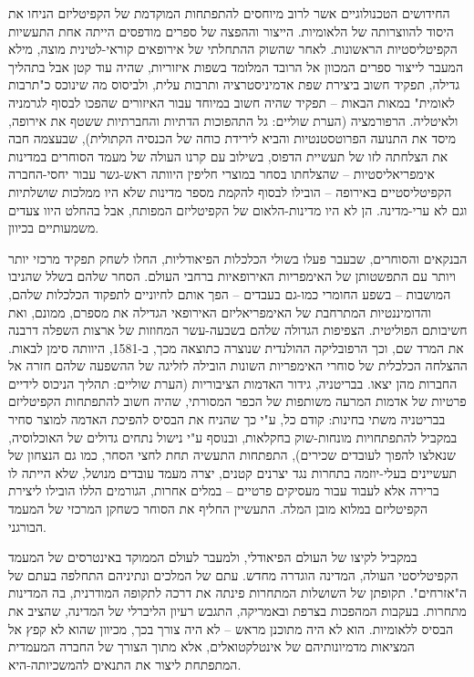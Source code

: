 החידושים הטכנולוגיים אשר לרוב מיוחסים להתפתחות המוקדמת של הקפיטליזם הניחו את היסוד להווצרותה של הלאומיות. הייצור וההפצה של ספרים מודפסים הייתה אחת התעשיות הקפיטליסטיות הראשונות. לאחר שהשוק ההתחלתי של אירופאים קוראי-לטינית מוצה, מילא המעבר לייצור ספרים המכוון אל הרובד המלומד בשפות איזוריות, שהיה עוד קטן אבל בתהליך גדילה, תפקיד חשוב ביצירת שפת אדמיניסטרציה ותרבות עלית, ולביסוס מה שינוכס כ"תרבות לאומית" במאות הבאות – תפקיד שהיה חשוב במיוחד עבור האיזורים שהפכו לבסוף לגרמניה ולאיטליה. הרפורמציה (הערת שוליים: גל התהפוכות הדתיות והחברתיות ששטף את אירופה, מיסד את התנועה הפרוטסטנטיות והביא לירידת כוחה של הכנסיה הקתולית), שבעצמה חבה את הצלחתה לזו של תעשיית הדפוס, בשילוב עם קרנו העולה של מעמד הסוחרים במדינות אימפריאליסטיות – שהצלחתו בסחר במוצרי חליפין היוותה ראש-גשר עבור יחסי-החברה הקפיטליסטיים באירופה – הובילו לבסוף להקמת מספר מדינות שלא היו ממלכות שושלתיות וגם לא ערי-מדינה. הן לא היו מדינות-הלאום של הקפיטליזם המפותח, אבל בהחלט היוו צעדים משמעותיים בכיוון.

הבנקאים והסוחרים, שבעבר פעלו בשולי הכלכלות הפיאודליות, החלו לשחק תפקיד מרכזי יותר ויותר עם התפשטותן של האימפריות האירופאיות ברחבי העולם. הסחר שלהם בשלל שהניבו המושבות – בשפע החומרי כמו-גם בעבדים – הפך אותם לחיוניים לתפקוד הכלכלות שלהם, והדומיננטיות המתרחבת של האימפריאליזם האירופאי הגדילה את מספרם, ממונם, ואת חשיבותם הפוליטית. הצפיפות הגדולה שלהם בשבעה-עשר המחוזות של ארצות השפלה דרבנה את המרד שם, וכך הרפובליקה ההולנדית שנוצרה כתוצאה מכך, ב-1581, היוותה סימן לבאות. ההצלחה הכלכלית של סוחרי האימפריות השונות הובילה לזליגה של ההשפעה שלהם חזרה אל החברות מהן יצאו. בבריטניה, גידור האדמות הציבוריות (הערת שוליים: תהליך הניכוס לידיים פרטיות של אדמות המרעה משותפות של הכפר המסורתי, שהיה חשוב להתפתחות הקפיטליזם בבריטניה משתי בחינות: קודם כל, ע"י כך שהניח את הבסיס להפיכת האדמה למוצר סחיר במקביל להתפתחויות מונחות-שוק בחקלאות, ובנוסף ע"י נישול נתחים גדולים של האוכלוסיה, שנאלצו להפוך לעובדים שכירים), התפתחות התעשיה תחת לחצי הסחר, כמו גם הנצחון של תעשיינים בעלי-יוזמה בתחרות נגד יצרנים קטנים, יצרה מעמד עובדים מנושל, שלא הייתה לו ברירה אלא לעבוד עבור מעסיקים פרטיים – במלים אחרות, הגורמים הללו הובילו ליצירת הקפיטליזם במלוא מובן המלה. התעשיין החליף את הסוחר כשחקן המרכזי של המעמד הבורגני.

במקביל לקיצו של העולם הפיאודלי, ולמעבר לעולם הממוקד באינטרסים של המעמד הקפיטליסטי העולה, המדינה הוגדרה מחדש. עתם של המלכים ונתיניהם התחלפה בעתם של ה"אזרחים". תקופתן של השושלות המתחרות פינתה את דרכה לתקופה המודרנית, בה המדינות מתחרות. בעקבות המהפכות בצרפת ובאמריקה, התגבש רעיון הליברלי של המדינה, שהציב את הבסיס ללאומיות. הוא לא היה מתוכנן מראש – לא היה צורך בכך, מכיוון שהוא לא קפץ אל המציאות מדמיונותיהם של אינטלקטואלים, אלא מתוך הצורך של החברה המעמדית המתפתחת ליצור את התנאים להמשכיותה-היא.

